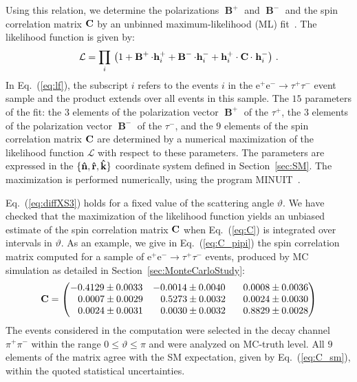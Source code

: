 \documentclass[a4paper,12pt,twocolumn]{article}
\numberwithin{equation}{section} %
\newcommand{\CC}{\operatorname{\bf C}}
\newcommand{\hk}{{\bf \hat{k}}}
\newcommand{\hr}{{\bf \hat{r}}}
\newcommand{\hn}{{\bf \hat{n}}}
\newcommand{\Pem}{\ensuremath{\textrm{e}^{-}}\xspace}
\newcommand{\Pep}{\ensuremath{\textrm{e}^{+}}\xspace}
\newcommand{\Pgpm}{\ensuremath{\pi^{-}}\xspace}
\newcommand{\Pgpp}{\ensuremath{\pi^{+}}\xspace}
\newcommand{\Pgtm}{\ensuremath{\tau^{-}}\xspace}
\newcommand{\Pgtp}{\ensuremath{\tau^{+}}\xspace}
\newcommand{\hvecp}{\ensuremath{\mathbf{h}^{+}}\xspace}
\newcommand{\hvecm}{\ensuremath{\mathbf{h}^{-}}\xspace}
\newcommand{\Bvecp}{\ensuremath{\operatorname{\mathbf{B}}^{+}}\xspace}
\newcommand{\Bvecm}{\ensuremath{\operatorname{\mathbf{B}}^{-}}\xspace}
\begin{document}
Using this relation, we determine the polarizations $\Bvecp$ and $\Bvecm$ 
and the spin correlation matrix $\CC$ by an unbinned maximum-likelihood (ML) fit~\cite{Rossi:2018}.
The likelihood function is given by:
\begin{equation}
\mathcal{L} = \prod_{i} \, \left( 1 + \Bvecp \cdot \hvecp_{i} + \Bvecm \cdot \hvecm_{i} + \hvecp_{i} \cdot \CC \cdot \;\hvecm_{i} \right) \, .
\label{eq:lf}
\end{equation}
In Eq.~(\ref{eq:lf}), the subscript $i$ refers to the events $i$ in the $\Pep\Pem \to \Pgtp\Pgtm$ event sample and the product extends over all events in this sample. 
The $15$ parameters of the fit: the $3$ elements of the polarization vector $\Bvecp$ of the $\Pgtp$, the $3$ elements of the polarization vector $\Bvecm$ of the $\Pgtm$, and the $9$ elements of the spin correlation matrix $\CC$ are determined by a numerical maximization of the likelihood function $\mathcal{L}$ with respect to these parameters.
The parameters are expressed in the $\{\hn, \hr, \hk\}$ coordinate system defined in Section~\ref{sec:SM}.
The maximization is performed numerically, using the program MINUIT~\cite{James:1975dr}.

Eq.~(\ref{eq:diffXS3}) holds for a fixed value of the scattering angle $\vartheta$. We have checked that the maximization of the likelihood function yields an unbiased estimate of the spin correlation matrix $\CC$ when Eq.~(\ref{eq:C}) is integrated over intervals in $\vartheta$.
As an example, we give in Eq.~(\ref{eq:C_pipi}) the spin correlation matrix computed for a sample of $\Pep\Pem \to \Pgtp\Pgtm$ events, produced by MC simulation as detailed in Section~\ref{sec:MonteCarloStudy}:
\begin{equation}
\label{eq:C_pipi}
\CC =
\begin{pmatrix}
 -0.4129 \pm 0.0033 & -0.0014 \pm 0.0040 & \;\;\;0.0008 \pm 0.0036 \\
  \;\;\;0.0007 \pm 0.0029 &  \;\;\;0.5273 \pm 0.0032 & \;\;\;0.0024 \pm 0.0030 \\
  \;\;\;0.0024 \pm 0.0031 &  \;\;\;0.0030 \pm 0.0032 & \;\;\;0.8829 \pm 0.0028 
\end{pmatrix}
\end{equation}
The events considered in the computation were selected in the decay channel $\Pgpp\Pgpm$ within the range $0 \leq \vartheta \leq \pi$ and were analyzed on MC-truth level. All $9$ elements of the matrix agree with the SM expectation, given by Eq.~(\ref{eq:C_sm}), within the quoted statistical uncertainties.
\end{document}
